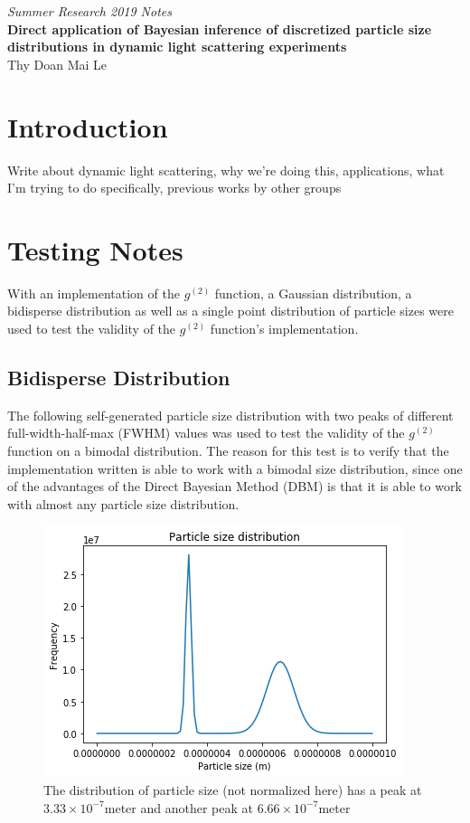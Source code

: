 \documentclass[11pt]{article}
\begin{document}
\centering
\textit{Summer Research 2019 Notes}\\
\textbf{Direct application of Bayesian inference of discretized particle size distributions in dynamic light scattering experiments}\\
Thy Doan Mai Le

\justifying
\section{Introduction}
Write about dynamic light scattering, why we're doing this, applications, what I'm trying to do specifically, previous works by other groups

\section{Testing Notes}
With an implementation of the $g^{(2)}$ function, a Gaussian distribution, a bidisperse distribution as well as a single point distribution of particle sizes were used to test the validity of the $g^{(2)}$ function's implementation. 
\subsection{Bidisperse Distribution}
The following self-generated particle size distribution with two peaks of different full-width-half-max (FWHM) values was used to test the validity of the $g^{(2)}$ function on a bimodal distribution. The reason for this test is to verify that the implementation written is able to work with a bimodal size distribution, since one of the advantages of the Direct Bayesian Method (DBM) is that it is able to work with almost any particle size distribution. 

\begin{figure}[h]
\centering
\includegraphics[width=0.5\linewidth]{bidisperse_psd.png}
\caption{The distribution of particle size (not normalized here) has a peak at $3.33\times10^{-7}$\si{meter} and another peak at $6.66\times10^{-7}$\si{meter}}
\label{fig:bidisperse_psd}
\end{figure}
\end{document}
